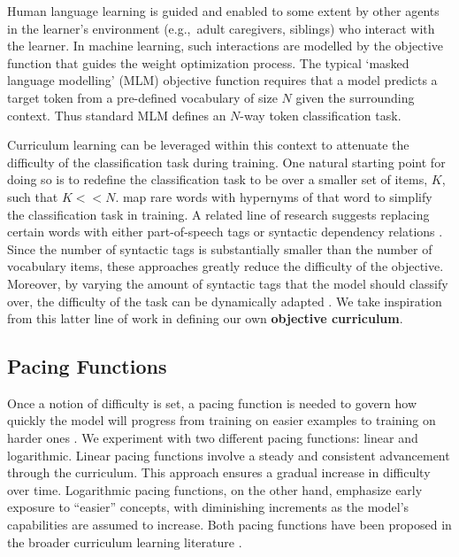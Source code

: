 Human language learning is guided and enabled to some extent by other agents in the learner's environment (e.g.,\ adult caregivers, siblings) who interact with the learner. In machine learning, such interactions are modelled by the objective function that guides the weight optimization process. The typical `masked language modelling' (MLM) objective function requires that a model predicts a target token from a pre-defined vocabulary of size $N$ given the surrounding context. Thus standard MLM defines an $N$-way token classification task.

Curriculum learning can be leveraged within this context to attenuate the difficulty of the classification task during training. One natural starting point for doing so is to redefine the classification task to be over a smaller set of items, $K$, such that $ K << N$.
\citet{bai2022better} map rare words with hypernyms of that word to simplify the classification task in training. A related line of research suggests replacing certain words with either part-of-speech tags \cite{wang2023language} or syntactic dependency relations \cite{cui2022lert}. Since the number of syntactic tags is substantially smaller than the number of vocabulary items, these approaches greatly reduce the difficulty of the objective. Moreover, by varying the amount of syntactic tags that the model should classify over, the difficulty of the task can be dynamically adapted \cite{wang2023language}. We take inspiration from this latter line of work in defining our own \textbf{objective curriculum}.

\subsection{Pacing Functions} Once a notion of difficulty is set, a pacing function is needed to govern how quickly the model will progress from training on easier examples to training on harder ones \cite{wu2021when}. We experiment with two different pacing functions: linear and logarithmic. Linear pacing functions involve a steady and consistent advancement through the curriculum. This approach ensures a gradual increase in difficulty over time. Logarithmic pacing functions, on the other hand, emphasize early exposure to ``easier'' concepts, with diminishing increments as the model's capabilities are assumed to increase. Both pacing functions have been proposed in the broader curriculum learning literature \citep{bai2022better, li2021curriculum, wu2021when}.

